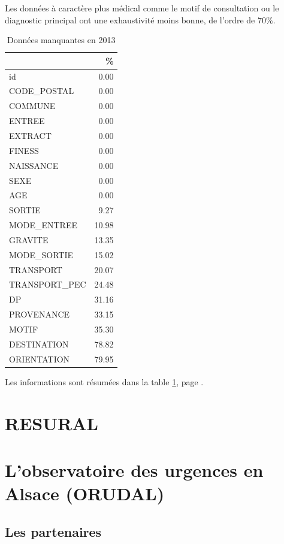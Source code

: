 \documentclass[12pt,english,french,twoside]{report}\usepackage[]{graphicx}\usepackage[]{color}
\begin{document}
Les données à caractère plus médical comme le motif de consultation ou le diagnostic principal ont une exhaustivité moins bonne, de l'ordre de $70\%$.

\begin{table}[ht]
\centering
\begin{tabular}{|l|r|}
  \hline
 & \% \\ 
  \hline
id & 0.00 \\ 
  CODE\_POSTAL & 0.00 \\ 
  COMMUNE & 0.00 \\ 
  ENTREE & 0.00 \\ 
  EXTRACT & 0.00 \\ 
  FINESS & 0.00 \\ 
  NAISSANCE & 0.00 \\ 
  SEXE & 0.00 \\ 
  AGE & 0.00 \\ 
  SORTIE & 9.27 \\ 
  MODE\_ENTREE & 10.98 \\ 
  GRAVITE & 13.35 \\ 
  MODE\_SORTIE & 15.02 \\ 
  TRANSPORT & 20.07 \\ 
  TRANSPORT\_PEC & 24.48 \\ 
  DP & 31.16 \\ 
  PROVENANCE & 33.15 \\ 
  MOTIF & 35.30 \\ 
  DESTINATION & 78.82 \\ 
  ORIENTATION & 79.95 \\ 
   \hline
\end{tabular}
\caption{Données manquantes en 2013} 
\label{tab2}
\end{table}




Les informations sont résumées dans la table \ref{tab2}, page \pageref{tab2}.

\chapter{RESURAL}
\chapter{L'observatoire des urgences en Alsace (ORUDAL)}
  \section*{Les partenaires}
\end{document}
